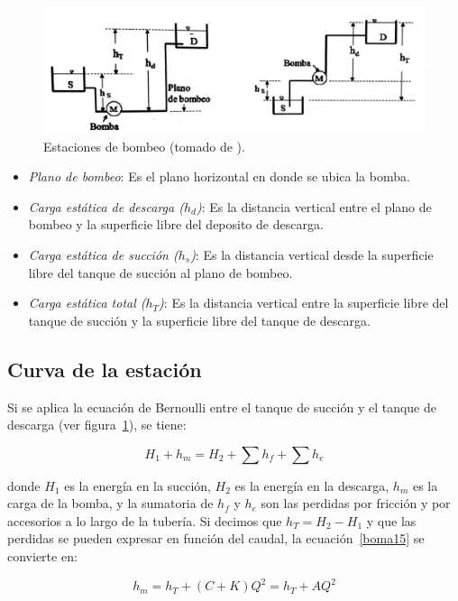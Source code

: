 \documentclass[11pt, oneside]{article}
\begin{document}
\begin{figure}[h]
\centering
\includegraphics[width=12cm]{./figs/bom18.jpeg}
\caption{Estaciones de bombeo (tomado de \cite{agudelo2011mecanica}).} 
\label{bom12}
\end{figure}

\begin{itemize}
\item \emph{Plano de bombeo}: Es el plano horizontal en donde se ubica la bomba.  
\item \emph{Carga est\'atica de descarga ($h_d$)}: Es la distancia vertical entre el plano de bombeo y la superficie libre del deposito de descarga. 
\item \emph{Carga est\'atica de succi\'on ($h_s$)}: Es la distancia vertical desde la superficie libre del tanque de succi\'on al plano de bombeo.
\item \emph{Carga est\'atica total ($h_T$)}: Es la distancia vertical entre la superficie libre del tanque de succi\'on y la superficie libre del tanque de descarga. 
\end{itemize}

\subsection{Curva de la estaci\'on}
Si se aplica la ecuaci\'on de Bernoulli entre el tanque de succi\'on y el tanque de descarga (ver figura~\ref{bom12}), se tiene:

\begin{equation}
H_1 + h_m = H_2 + \sum h_f + \sum h_e 
\label{boma15}
\end{equation}

donde $H_1$ es la energ\'ia en la succi\'on, $H_2$ es la energ\'ia en la descarga, $h_m$ es la carga de la bomba, y la sumatoria de $h_f$ y $h_e$ son las perdidas por fricci\'on y por accesorios a lo largo de la tuber\'ia. Si decimos que $h_T = H_2-H_1$ y que las perdidas se pueden expresar en funci\'on del caudal, la ecuaci\'on~\ref{boma15} se convierte en:

\begin{equation}
h_m = h_T + (C+K)Q^2 = h_T +A Q^2
\label{boma16}
\end{equation}
\end{document}
